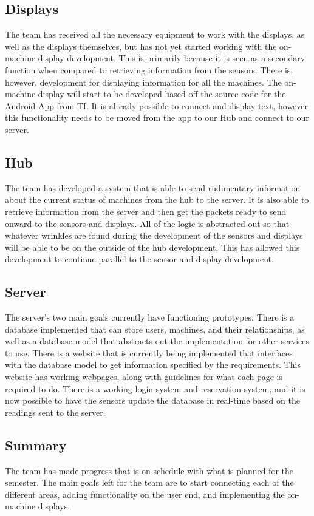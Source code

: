 \documentclass[letterpaper,11pt]{./templates/texMemo} %
\begin{document}
\subsection{Displays}
The team has received all the necessary equipment to work with the displays, as well as the displays themselves, but has not yet started working with the on-machine display development. This is primarily because it is seen as a secondary function when compared to retrieving information from the sensors. There is, however, development for displaying information for all the machines. The on-machine display will start to be developed based off the source code for the Android App from TI. It is already possible to connect and display text, however this functionality needs to be moved from the app to our Hub and connect to our server.

\subsection{Hub}
The team has developed a system that is able to send rudimentary information about the current status of machines from the hub to the server. It is also able to retrieve information from the server and then get the packets ready to send onward to the sensors and displays. All of the logic is abstracted out so that whatever wrinkles are found during the development of the sensors and displays will be able to be on the outside of the hub development. This has allowed this development to continue parallel to the sensor and display development.

\subsection{Server}
The server's two main goals currently have functioning prototypes. There is a database implemented that can store users, machines, and their relationships, as well as a database model that abstracts out the implementation for other services to use. There is a website that is currently being implemented that interfaces with the database model to get information specified by the requirements. This website has working webpages, along with guidelines for what each page is required to do. There is a working login system and reservation system, and it is now possible to have the sensors update the database in real-time based on the readings sent to the server.

\subsection{Summary}
The team has made progress that is on schedule with what is planned for the semester. The main goals left for the team are to start connecting each of the different areas, adding functionality on the user end, and implementing the on-machine displays.
\end{document}
